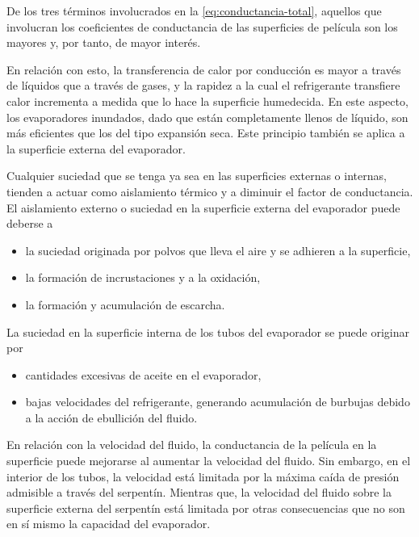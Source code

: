 				De los tres términos involucrados en la \autoref{eq:conductancia-total}, aquellos que involucran los coeficientes de conductancia de las superficies de película son los mayores y, por tanto, de mayor interés.
				
				
				En relación con esto, la transferencia de calor por conducción es mayor a través de líquidos que a través de gases, y la rapidez a la cual el refrigerante transfiere calor incrementa a medida que lo hace la superficie humedecida. En este aspecto, los evaporadores inundados, dado que están completamente llenos de líquido, son más eficientes que los del tipo expansión seca. Este principio también se aplica a la superficie externa del evaporador.
		
		
				Cualquier suciedad que se tenga ya sea en las superficies externas o internas, tienden a actuar como aislamiento térmico y a diminuir el factor de conductancia. El aislamiento externo o suciedad en la superficie externa del evaporador puede deberse a
				
				\begin{itemize}
					\item la suciedad originada por polvos que lleva el aire y se adhieren a la superficie,
					\item la formación de incrustaciones y a la oxidación,
					\item la formación y acumulación de escarcha.
				\end{itemize}
				
				La suciedad en la superficie interna de los tubos del evaporador se puede originar por
				
				\begin{itemize}
					\item cantidades excesivas de aceite en el evaporador,
					\item bajas velocidades del refrigerante, generando acumulación de burbujas debido a la acción de ebullición del fluido.
				\end{itemize}
				
				En relación con la velocidad del fluido, la conductancia de la película en la superficie puede mejorarse al aumentar la velocidad del fluido. Sin embargo, en el interior de los tubos, la velocidad está limitada por la máxima caída de presión admisible a través del serpentín. Mientras que, la velocidad del fluido sobre la superficie externa del serpentín está limitada por otras consecuencias que no son en sí mismo la capacidad del evaporador.
				
